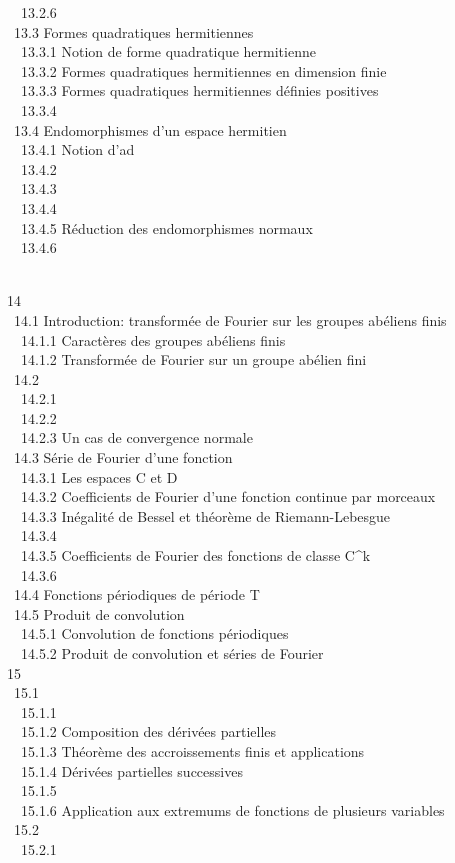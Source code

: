 \documentclass[]{article}
\begin{document}
~~13.2.6 
\\ ~13.3 {Formes quadratiques
hermitiennes} \\ ~~13.3.1 {Notion
de forme quadratique hermitienne} \\ ~~13.3.2
{Formes quadratiques hermitiennes
en dimension finie} \\ ~~13.3.3
{Formes quadratiques hermitiennes
définies positives} \\ ~~13.3.4
 \\ ~13.4
{Endomorphismes d'un espace
hermitien} \\ ~~13.4.1 {Notion
d'ad\jmathoint} \\ ~~13.4.2
 \\
~~13.4.3  \\
~~13.4.4  \\
~~13.4.5 {Réduction des
endomorphismes normaux} \\ ~~13.4.6

\\ 14  \\ ~14.1
{Introduction: transformée de
Fourier sur les groupes abéliens finis} \\ ~~14.1.1
{Caractères des groupes abéliens
finis} \\ ~~14.1.2 {Transformée
de Fourier sur un groupe abélien fini} \\ ~14.2
 \\
~~14.2.1 
\\ ~~14.2.2  \\
~~14.2.3 {Un cas de convergence
normale} \\ ~14.3 {Série de Fourier
d'une fonction} \\ ~~14.3.1 {Les
espaces C et D} \\ ~~14.3.2
{Coefficients de Fourier d'une
fonction continue par morceaux} \\ ~~14.3.3
{Inégalité de Bessel et théorème
de Riemann-Lebesgue} \\ ~~14.3.4
 \\
~~14.3.5 {Coefficients de Fourier
des fonctions de classe C^k} \\ ~~14.3.6
 \\
~14.4 {Fonctions périodiques de
période T} \\ ~14.5 {Produit de
convolution} \\ ~~14.5.1
{Convolution de fonctions
périodiques} \\ ~~14.5.2 {Produit
de convolution et séries de Fourier} \\ 15
 \\ ~15.1
 \\ ~~15.1.1
 \\
~~15.1.2 {Composition des
dérivées partielles} \\ ~~15.1.3
{Théorème des accroissements
finis et applications} \\ ~~15.1.4
{Dérivées partielles
successives} \\ ~~15.1.5
 \\ ~~15.1.6
{Application aux extremums de
fonctions de plusieurs variables} \\ ~15.2
 \\ ~~15.2.1
\end{document}
